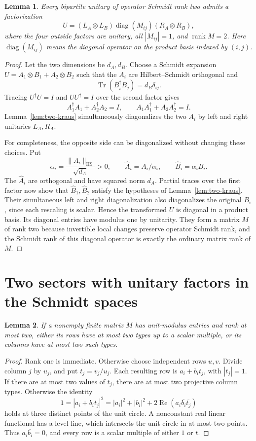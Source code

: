 \documentclass[11pt]{article}
\newtheorem{lemma}{Lemma}
\newcommand{\HS}{\mathrm{HS}}
\begin{document}
\begin{lemma}\label{lem:bipartite-diagonal}
Every bipartite unitary of operator Schmidt rank two admits a
factorization
\[
 U=(L_A\otimes L_B)\operatorname{diag}(M_{ij})(R_A\otimes R_B),
\]
where the four outside factors are unitary, all $|M_{ij}|=1$, and
$\operatorname{rank}M=2$. Here $\operatorname{diag}(M_{ij})$ means
the diagonal operator on the product basis indexed by $(i,j)$.
\end{lemma}
\begin{proof}
Let the two dimensions be $d_A,d_B$. Choose a Schmidt expansion
$U=A_1\otimes B_1+A_2\otimes B_2$ such that the $A_i$ are
Hilbert--Schmidt orthogonal and
\[
 \operatorname{Tr}(B_i^\dagger B_j)=d_B\delta_{ij}.
\]
Tracing $U^\dagger U=I$ and $UU^\dagger=I$ over the second factor gives
\[
 A_1^\dagger A_1+A_2^\dagger A_2=I,
 \qquad A_1A_1^\dagger+A_2A_2^\dagger=I.
\]
Lemma~\ref{lem:two-kraus} simultaneously diagonalizes the two $A_i$
by left and right unitaries $L_A,R_A$.

For completeness, the opposite side can be diagonalized without changing
these choices. Put
\[
 \alpha_i=\frac{\|A_i\|_\HS}{\sqrt{d_A}}>0,
 \qquad \widehat A_i=A_i/\alpha_i,
 \qquad \widehat B_i=\alpha_iB_i.
\]
The $\widehat A_i$ are orthogonal and have squared norm $d_A$.
Partial traces over the first factor now show that $\widehat B_1,
\widehat B_2$ satisfy the hypotheses of Lemma~\ref{lem:two-kraus}.
Their simultaneous left and right diagonalization also diagonalizes the
original $B_i$, since each rescaling is scalar. Hence the transformed
$U$ is diagonal in a product basis. Its diagonal entries have modulus
one by unitarity. They form a matrix $M$ of rank two because invertible
local changes preserve operator Schmidt rank, and the Schmidt rank of
this diagonal operator is exactly the ordinary matrix rank of $M$.
\end{proof}

\section{Two sectors with unitary factors in the Schmidt spaces}

\begin{lemma}\label{lem:circle}
If a nonempty finite matrix $M$ has unit-modulus entries and rank at
most two, either its rows have at most two types up to a scalar multiple,
or its columns have at most two such types.
\end{lemma}
\begin{proof}
Rank one is immediate. Otherwise choose independent rows $u,v$.
Divide column $j$ by $u_j$, and put $t_j=v_j/u_j$. Each resulting row
is $a_i+b_it_j$, with $|t_j|=1$. If there are at most two values of
$t_j$, there are at most two projective column types. Otherwise the
identity
\[
 1=|a_i+b_it_j|^2
   =|a_i|^2+|b_i|^2+
      2\operatorname{Re}(a_i\overline{b_i}\overline{t_j})
\]
holds at three distinct points of the unit circle. A nonconstant real
linear functional has a level line, which intersects the unit circle
in at most two points. Thus $a_i\overline{b_i}=0$, and every row is
a scalar multiple of either $1$ or $t$.
\end{proof}
\end{document}
